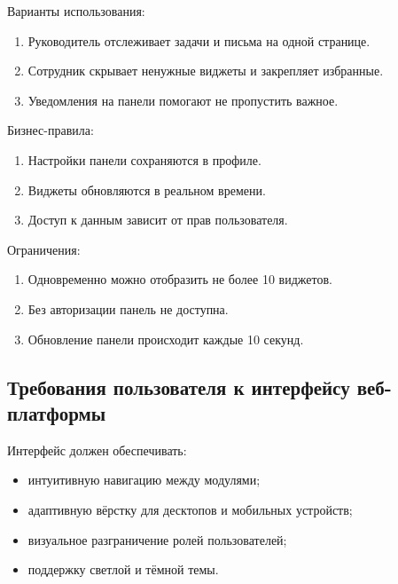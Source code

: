 Варианты использования:
\begin{enumerate}
  \item Руководитель отслеживает задачи и письма на одной странице.
  \item Сотрудник скрывает ненужные виджеты и закрепляет избранные.
  \item Уведомления на панели помогают не пропустить важное.
\end{enumerate}

Бизнес-правила:
\begin{enumerate}
  \item Настройки панели сохраняются в профиле.
  \item Виджеты обновляются в реальном времени.
  \item Доступ к данным зависит от прав пользователя.
\end{enumerate}

Ограничения:
\begin{enumerate}
  \item Одновременно можно отобразить не более 10 виджетов.
  \item Без авторизации панель не доступна.
  \item Обновление панели происходит каждые 10 секунд.
\end{enumerate}


\subsection{Требования пользователя к интерфейсу веб-платформы}

Интерфейс должен обеспечивать:
\begin{itemize}
  \item интуитивную навигацию между модулями;
  \item адаптивную вёрстку для десктопов и мобильных устройств;
  \item визуальное разграничение ролей пользователей;
  \item поддержку светлой и тёмной темы.
\end{itemize}


